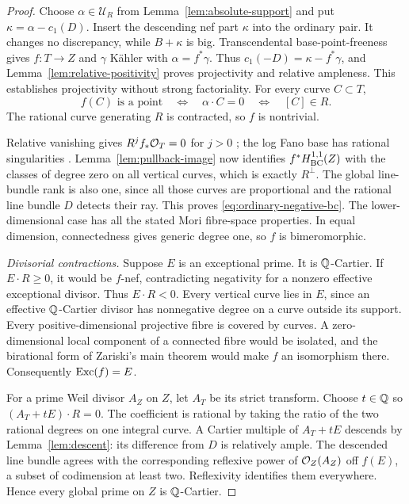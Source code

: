 \begin{proof}
Choose $\alpha\in\mathcal U_R$ from Lemma~\ref{lem:absolute-support}
and put $\kappa=\alpha-c_1(D)$.  Insert the descending nef part
$\kappa$ into the ordinary pair.  It changes no discrepancy, while
$B+\kappa$ is big.  Transcendental base-point-freeness gives
$f:T\to Z$ and $\gamma$ K\"ahler with $\alpha=f^*\gamma$.
Thus $c_1(-D)=\kappa-f^*\gamma$, and
Lemma~\ref{lem:relative-positivity} proves projectivity and relative
ampleness.  This establishes projectivity without strong factoriality.
For every curve $C\subset T$,
\begin{equation}\label{eq:ordinary-contracted-curves}
 f(C)\text{ is a point}\quad\Longleftrightarrow\quad
 \alpha\cdot C=0\quad\Longleftrightarrow\quad[C]\in R.
\end{equation}
The rational curve generating $R$ is contracted, so $f$ is nontrivial.

Relative vanishing gives $R^j f_*\mathcal O_T=0$ for $j>0$
\cite[Theorem~5.2]{Fujino2022}; the log Fano base has rational
singularities \cite[Lemma~8.8]{DHP2024}.  Lemma~\ref{lem:pullback-image}
now identifies $f^*H^{1,1}_{\mathrm{BC}}(Z)$ with the classes of degree zero on all
vertical curves, which is exactly $R^\perp$.  The global line-bundle
rank is also one, since all those curves are proportional and the
rational line bundle $D$ detects their ray.  This proves
\eqref{eq:ordinary-negative-bc}.  The lower-dimensional case has all
the stated Mori fibre-space properties.  In equal dimension,
connectedness gives generic degree one, so $f$ is bimeromorphic.

\smallskip\noindent
\emph{Divisorial contractions.}
Suppose $E$ is an exceptional prime.  It is $\mathbb Q$-Cartier.  If
$E\cdot R\geq0$, it would be $f$-nef, contradicting negativity for a
nonzero effective exceptional divisor.  Thus $E\cdot R<0$.  Every
vertical curve lies in $E$, since an effective $\mathbb Q$-Cartier divisor
has nonnegative degree on a curve outside its support.  Every
positive-dimensional projective fibre is covered by curves.  A
zero-dimensional local component of a connected fibre would be isolated,
and the birational form of Zariski's main theorem would make $f$ an
isomorphism there.  Consequently $\operatorname{Exc}(f)=E$.

For a prime Weil divisor $A_Z$ on $Z$, let $A_T$ be its strict transform.
Choose $t\in\mathbb Q$ so $(A_T+tE)\cdot R=0$.  The coefficient is rational
by taking the ratio of the two rational degrees on one integral curve.
A Cartier multiple of $A_T+tE$ descends by Lemma~\ref{lem:descent}:
its difference from $D$ is relatively ample.  The descended line bundle
agrees with the corresponding reflexive power of $\mathcal O_Z(A_Z)$ off
$f(E)$, a subset of codimension at least two.  Reflexivity identifies
them everywhere.  Hence every global prime on $Z$ is $\mathbb Q$-Cartier.


\end{proof}
